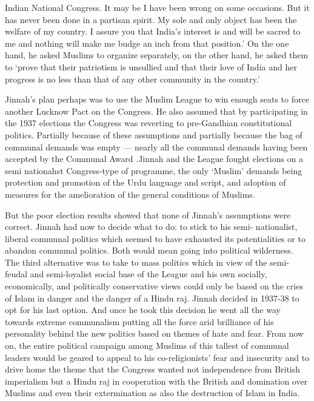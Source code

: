 Indian National Congress. It may be I have been wrong on some occasions. But it has never been done in a partisan spirit. My sole and only object has been the welfare of my country. I assure you that India’s interest is and will be sacred to me and nothing will make me budge an inch from that position.’ On the one hand, he asked Muslims to organize separately, on the other hand, he asked them to ‘prove that their patriotism is unsullied and that their love of India and her progress is no less than that of any other community in the country.’ 

Jinnah’s plan perhaps was to use the Muslim League to win enough seats to force another Lucknow Pact on the Congress. He also assumed that by participating in the 1937 elections the Congress was reverting to pre-Gandhian constitutional politics. Partially because of these assumptions and partially because the bag of communal demands was empty — nearly all the communal demands having been accepted by the Communal Award .Jinnah and the League fought elections on a semi­ nationahst Congress-type of programme, the only ‘Muslim’ demands being protection and promotion of the Urdu language and script, and adoption of measures for the amelioration of the general conditions of Muslims. 

But the poor election results showed that none of Jinnah’s assumptions were correct. Jinnah had now to decide what to do: to stick to his semi- nationalist, liberal communal politics which seemed to have exhausted its potentialities or to abandon communal politics. Both would mean going into political wilderness. The third alternative was to take to mass politics which in view of the semi-feudal and semi-loyalist social base of the League and his own socially, economically, and politically conservative views could only be based on the cries of Islam in danger and the danger of a Hindu raj. Jinnah decided in 1937-38 to opt for his last option. And once he took this decision he went all the way towards extreme communalism putting all the force arid brilliance of his personality behind the new politics based on themes of hate and fear. From now on, the entire political campaign among Muslims of this tallest of communal leaders would be geared to appeal to his co-religionists’ fear and insecurity and to drive home the theme that the Congress wanted not independence from British imperialism but a Hindu raj in cooperation with the British and domination over Muslims and even their extermination as also the destruction of Islam in India. 

